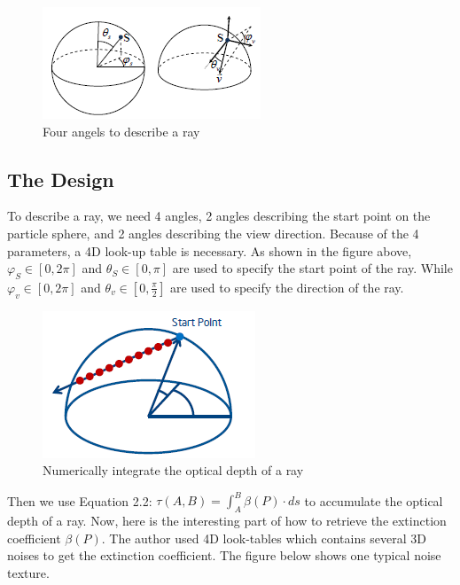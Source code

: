 \begin{figure}[htp]
\begin{center}
\includegraphics[scale=1.0]{images/startandview.png}
\caption{Four angels to describe a ray}
\label{f8}
\end{center}
\end{figure}

\subsection{The Design}
To describe a ray, we need 4 angles, 2 angles describing the start point on the particle sphere, and 2 angles describing the view direction. Because of the 4 parameters, a 4D look-up table is necessary. As shown in the figure above, $\varphi_S\in[0, 2\pi]$ and $\theta_S\in[0, \pi]$ are used to specify the start point of the ray. While $\varphi_v\in[0, 2\pi]$ and $\theta_v\in[0, \frac{\pi}{2}]$ are used to specify the direction of the ray.

\begin{figure}[htp]
\begin{center}
\includegraphics[scale=0.8]{images/opticaldepthintegration.png}
\caption{Numerically integrate the optical depth of a ray}
\label{f9}
\end{center}
\end{figure}

Then we use Equation 2.2: $\tau(A, B) = \int_{A}^{B}\beta(P)\cdot ds$ to accumulate the optical depth of a ray. Now, here is the interesting part of how to retrieve the extinction coefficient $\beta(P)$. The author used 4D look-tables which contains several 3D noises to get the extinction coefficient. The figure below shows one typical noise texture.

